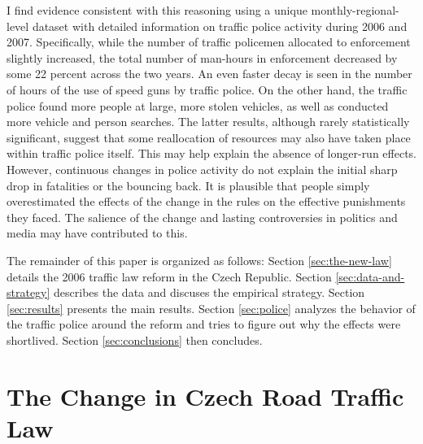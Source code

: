 \documentclass[12pt]{article}
\begin{document}
I find evidence consistent with this reasoning using a unique
monthly-regional-level dataset with detailed information on traffic police
activity during 2006 and 2007.  Specifically, while the number of traffic
policemen allocated to enforcement slightly increased, the total number of
man-hours in enforcement decreased by some 22 percent across the two years.  An
even faster decay is seen in the number of hours of the use of speed guns by
traffic police. On the other hand, the traffic police found more people at
large, more stolen vehicles, as well as conducted more vehicle and person
searches. The latter results, although rarely statistically significant, suggest
that some reallocation of resources may also have taken place within traffic
police itself. This may help explain the absence of longer-run effects.
However, continuous changes in police activity do not explain the initial sharp
drop in fatalities or the bouncing back. It is plausible that people simply
overestimated the effects of the change in the rules on the effective
punishments they faced. The salience of the change and lasting controversies in
politics and media may have contributed to this.

The remainder of this paper is organized as follows:  Section
\ref{sec:the-new-law} details the 2006 traffic law reform in the Czech Republic.
Section \ref{sec:data-and-strategy} describes the data and discuses the
empirical strategy.  Section \ref{sec:results} presents the main results.
Section \ref{sec:police} analyzes the behavior of the traffic police around the
reform and tries to figure out why the effects were shortlived.  Section
\ref{sec:conclusions} then concludes.

\section*{The Change in Czech Road Traffic Law} %
\label{sec:the-new-law}
\end{document}

